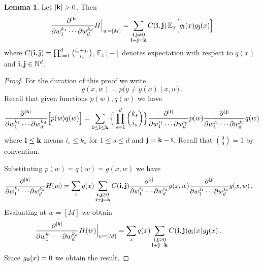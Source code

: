 \documentclass[english,letter paper,12pt,reqno]{article}
\theoremstyle{definition}
\newtheorem{lemma}[theorem]{Lemma}
\begin{document}
\begin{lemma}\label{lemma:partial_derivatives_H} Let $|\bold{k}| > 0$. Then
\begin{equation}
\frac{\partial^{|\bold{k}|}}{ \partial w_1^{k_1} \cdots \partial w_d^{k_d}} H \Bigr|_{w = [M]} =\sum_{\substack{\bold{i},\bold{j} \neq 0 \\ \bold{i} + \bold{j} = \bold{k}}} C(\bold{i}, \bold{j})\, \mathbb{E}_x\Big[ g_{\bold{i}}(x) g_{\bold{j}}(x) \Big]
\end{equation}
where $C(\bold{i}, \bold{j}) = \prod_{s=1}^d \binom{i_s + j_s}{i_s}$, $\mathbb{E}_x[-]$ denotes expectation with respect to $q(x)$ and $\bold{i}, \bold{j} \in \mathbb{N}^d$.
\end{lemma}
\begin{proof}
For the duration of this proof we write
\[
g(x,w) = p\big( y \neq y(x) \mid x, w \big)\,.
\]
Recall that given functions $p(w), q(w)$ we have
\[
\frac{\partial^{|\bold{k}|}}{ \partial w_1^{k_1} \cdots \partial w_d^{k_d}}\Big[ p(w) q(w) \Big] = \sum_{0 \le \bold{i} \le \bold{k}} \Big\{ \prod_{s=1}^d \binom{k_s}{i_s} \Big\} \frac{\partial^{|\bold{i}|}}{ \partial w_1^{i_1} \cdots \partial w_d^{i_d}} p(w) \frac{\partial^{|\bold{j}|}}{ \partial w_1^{j_1} \cdots \partial w_d^{j_d}} q(w)
\]
where $\bold{i} \le \bold{k}$ means $i_s \le k_s$ for $1 \le s \le d$ and $\bold{j} = \bold{k} - \bold{i}$. Recall that $\binom{0}{0} = 1$ by convention.

Substituting $p(w) = q(w) = g(x,w)$ we have
\begin{align*}
\frac{\partial^{|\bold{k}|}}{ \partial w_1^{k_1} \cdots \partial w_d^{k_d}} H(w) &= \sum_x q(x) \sum_{\substack{\bold{i},\bold{j} \ge 0 \\ \bold{i} + \bold{j} = \bold{k}}} C(\bold{i},\bold{j}) \frac{\partial^{|\bold{i}|}}{ \partial w_1^{i_1} \cdots \partial w_d^{i_d}} g(x,w) \frac{\partial^{|\bold{j}|}}{ \partial w_1^{j_1} \cdots \partial w_d^{j_d}} g(x,w)\,.
\end{align*}
Evaluating at $w = [M]$ we obtain
\begin{align*}
\frac{\partial^{|\bold{k}|}}{ \partial w_1^{k_1} \cdots \partial w_d^{k_d}} H(w)\Bigr|_{w = [M]} &= \sum_x q(x) \sum_{\substack{\bold{i},\bold{j} \ge 0 \\ \bold{i} + \bold{j} = \bold{k}}} C(\bold{i},\bold{j}) g_{\bold{i}}(x) g_{\bold{j}}(x)\,.
\end{align*}
Since $g_{\bold{0}}(x) = 0$ we obtain the result.
\end{proof}
\end{document}
